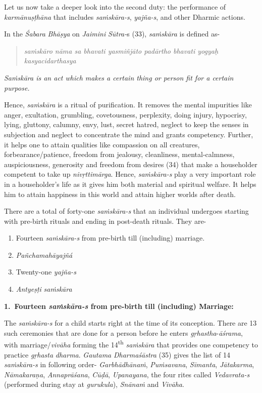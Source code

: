 Let us now take a deeper look into the second duty: the performance of \emph{karmānuṣṭhāna} that includes \emph{saṁskāra-s}, \emph{yajña-s}, and other Dharmic actions.

In the \emph{Śabara} \emph{Bhāṣya} on \emph{Jaimini} \emph{Sūtra-}s (33), \emph{saṁskāra} is defined as-

\begin{verse}
\emph{saṁskāro nāma sa bhavati yasmiñjāto padārtho bhavati yogyaḥ kasyacidarthasya }
\end{verse}

\emph{Saṁskāra is an act which makes a certain thing or person fit for a certain purpose.}

Hence, \emph{saṁskāra} is a ritual of purification. It removes the mental impurities like anger, exultation, grumbling, covetousness, perplexity, doing injury, hypocrisy, lying, gluttony, calumny, envy, lust, secret hatred, neglect to keep the senses in subjection and neglect to concentrate the mind and grants competency. Further, it helps one to attain qualities like compassion on all creatures, forbearance/patience, freedom from jealousy, cleanliness, mental-calmness, auspiciousness, generosity and freedom from desires (34) that make a householder competent to take up \emph{nivṛttimārga}. Hence, \emph{saṁskāra-s} play a very important role in a householder's life as it gives him both material and spiritual welfare. It helps him to attain happiness in this world and attain higher worlds after death.

There are a total of forty-one \emph{saṁskāra-s} that an individual undergoes starting with pre-birth rituals and ending in post-death rituals. They are-

\begin{enumerate}
\itemsep=0pt
\item
  Fourteen \emph{saṁskāra-s} from pre-birth till (including) marriage.
\item
  \emph{Pañchamahāyajñá}
\item
  Twenty-one \emph{yajña-s}
\item
  \emph{Antyeṣṭi} \emph{saṁskāra}
\end{enumerate}

\textbf{1.\ Fourteen \emph{saṁskāra-s} from pre-birth till (including) Marriage:}

The \emph{saṁskāra-s} for a child starts right at the time of its conception. There are 13 such ceremonies that are done for a person before he enters \emph{gṛhastha}-\emph{āśrama}, with marriage/\emph{vivāha} forming the 14\textsuperscript{th} \emph{saṁskāra} that provides one competency to practice \emph{gṛhasta} \emph{dharma}. \emph{Gautama} \emph{Dharmaśāstra} (35) gives the list of 14 \emph{saṁskāra-s} in following order- \emph{Garbhādhānaṁ}, \emph{Puṁsavana}, \emph{Sīmanta}, \emph{Jātakarma}, \emph{Nāmakaraṇa}, \emph{Annaprāśana}, \emph{Cūḍā}, \emph{Upanayana}, the four rites called \emph{Vedavrata-s} (performed during stay at \emph{gurukula}), \emph{Snānaṁ} and \emph{Vivāha}.

